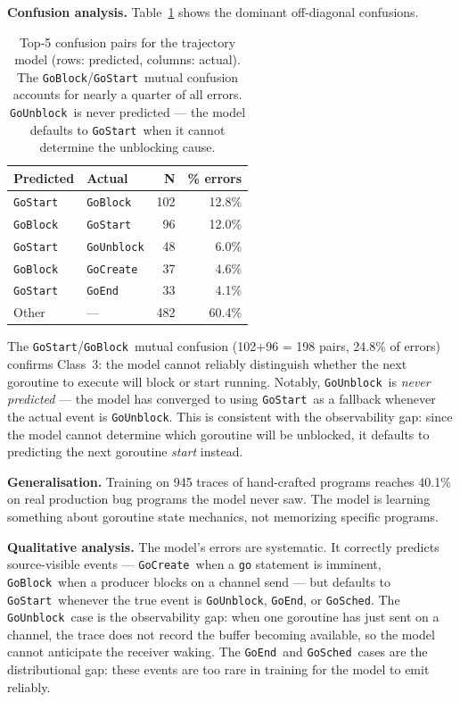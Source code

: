 \documentclass[10pt,conference]{IEEEtran}
\newcommand{\eblock}{\texttt{GoBlock}}
\newcommand{\eunblock}{\texttt{GoUnblock}}
\newcommand{\estart}{\texttt{GoStart}}
\newcommand{\ecreate}{\texttt{GoCreate}}
\newcommand{\eend}{\texttt{GoEnd}}
\newcommand{\esched}{\texttt{GoSched}}
\begin{document}
\textbf{Confusion analysis.}
Table~\ref{tab:confusion} shows the dominant off-diagonal confusions.

\begin{table}[t]
\centering
\caption{Top-5 confusion pairs for the trajectory model (rows:
predicted, columns: actual). The \eblock/\estart\ mutual confusion
accounts for nearly a quarter of all errors. \eunblock\ is never
predicted — the model defaults to \estart\ when it cannot determine
the unblocking cause.}
\label{tab:confusion}
\vspace*{8pt}
\small
\begin{tabular}{@{}p{1.8cm}p{1.8cm}rr@{}}
\toprule
\textbf{Predicted} & \textbf{Actual} & \textbf{N} & \textbf{\% errors}\\
\midrule
\estart    & \eblock   & 102 & 12.8\%\\
\eblock    & \estart   &  96 & 12.0\%\\
\estart    & \eunblock &  48 &  6.0\%\\
\eblock    & \ecreate  &  37 &  4.6\%\\
\estart    & \eend     &  33 &  4.1\%\\
\midrule
Other      & ---       & 482 & 60.4\%\\
\bottomrule
\end{tabular}
\end{table}

The \estart/\eblock\ mutual confusion (102+96 = 198 pairs, 24.8\%
of errors) confirms Class~3: the model cannot reliably distinguish
whether the next goroutine to execute will block or start running.
Notably, \eunblock\ is \emph{never predicted} — the model has
converged to using \estart\ as a fallback whenever the actual event
is \eunblock.
This is consistent with the observability gap: since the model cannot
determine which goroutine will be unblocked, it defaults to predicting
the next goroutine \emph{start} instead.

\textbf{Generalisation.}
Training on 945 traces of hand-crafted programs reaches 40.1\% on
real production bug programs the model never saw.
The model is learning something about goroutine state mechanics, not
memorizing specific programs.

\textbf{Qualitative analysis.}
The model's errors are systematic. It correctly predicts source-visible
events — \ecreate\ when a \texttt{go} statement is imminent, \eblock\
when a producer blocks on a channel send — but defaults to \estart\
whenever the true event is \eunblock, \eend, or \esched.
The \eunblock\ case is the observability gap: when one goroutine has
just sent on a channel, the trace does not record the buffer becoming
available, so the model cannot anticipate the receiver waking.
The \eend\ and \esched\ cases are the distributional gap: these events
are too rare in training for the model to emit reliably.
\end{document}
